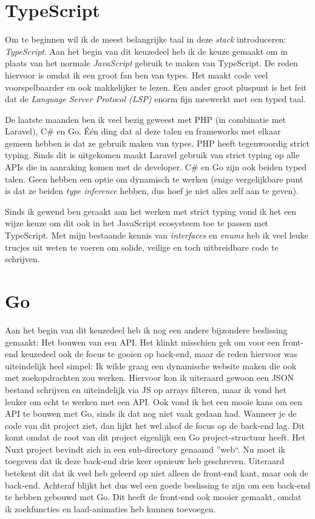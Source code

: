 \documentclass[a4paper]{report}
\begin{document}
    \section{TypeScript}
    Om te beginnen wil ik de meest belangrijke taal in deze \textit{stack} introduceren: \textit{TypeScript}.
    Aan het begin van dit keuzedeel heb ik de keuze gemaakt om in plaats van het normale \textit{JavaScript} gebruik te maken van TypeScript.
    De reden hiervoor is omdat ik een groot fan ben van types. Het maakt code veel voorspelbaarder en ook makkelijker te lezen.
    Een ander groot pluspunt is het feit dat de \textit{Language Server Protocol (LSP)} enorm fijn meewerkt met een typed taal.

    De laatste maanden ben ik veel bezig geweest met PHP (in combinatie met Laravel), C\# en Go. Één ding dat al deze talen en frameworks met elkaar gemeen hebben
    is dat ze gebruik maken van types. PHP heeft tegenwoordig strict typing. Sinds dit is uitgekomen maakt Laravel gebruik van strict typing op alle APIs die in aanraking komen met de developer.
    C\# en Go zijn ook beiden typed talen. Geen hebben een optie om dynamisch te werken (enige vergelijkbare punt is dat ze beiden \textit{type inference} hebben, dus hoef je niet alles zelf aan te geven).

    Sinds ik gewend ben geraakt aan het werken met strict typing vond ik het een wijze keuze om dit ook in het JavaScript ecosysteem toe te passen met TypeScript.
    Met mijn bestaande kennis van \textit{interfaces} en \textit{enums} heb ik veel leuke trucjes uit weten te voeren om solide, veilige en toch uitbreidbare code te schrijven.

    \section{Go}
    Aan het begin van dit keuzedeel heb ik nog een andere bijzondere beslissing gemaakt: Het bouwen van een API.
    Het klinkt misschien gek om voor een front-end keuzedeel ook de focus te gooien op back-end, maar de reden hiervoor was uiteindelijk heel simpel:
    Ik wilde graag een dynamische website maken die ook met zoekopdrachten zou werken. Hiervoor kon ik uiteraard gewoon een JSON bestand schrijven en uiteindelijk via JS op arrays filteren,
    maar ik vond het leuker om echt te werken met een API.
    Ook vond ik het een mooie kans om een API te bouwen met Go, sinds ik dat nog niet vaak gedaan had. Wanneer je de code van dit project ziet, dan lijkt het wel alsof de focus
    op de back-end lag. Dit komt omdat de root van dit project eigenlijk een Go project-structuur heeft. Het Nuxt project bevindt zich in een sub-directory genaamd ''web``.
    Nu moet ik toegeven dat ik deze back-end drie keer opnieuw heb geschreven. Uiteraard betekent dit dat ik veel heb geleerd op niet alleen de front-end kant, maar ook de back-end.
    Achteraf blijkt het dus wel een goede beslissing te zijn om een back-end te hebben gebouwd met Go. Dit heeft de front-end ook mooier gemaakt, omdat ik zoekfuncties en laad-animaties heb kunnen toevoegen.
\end{document}
